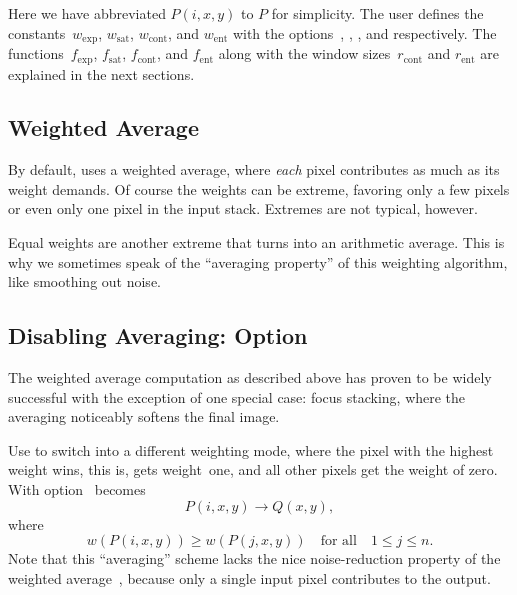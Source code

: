\noindent Here we have abbreviated $P(i, x, y)$ to $P$ for simplicity.  The user defines the
constants~$w_{\mathrm{exp}}$, $w_{\mathrm{sat}}$, $w_{\mathrm{cont}}$, and $w_{\mathrm{ent}}$
with the options~, ,
, and  respectively.  The
functions~$f_{\mathrm{exp}}$, $f_{\mathrm{sat}}$, $f_{\mathrm{cont}}$, and $f_{\mathrm{ent}}$
along with the window sizes~$r_{\mathrm{cont}}$ and $r_{\mathrm{ent}}$ are explained in the next
sections.


\subsection[Weighted Average]{\label{sec:weighted-average}%
  Weighted Average}

By default, \App{} uses a weighted average, where \emph{each} pixel contributes as much as its
weight demands.  Of course the weights can be extreme, favoring only a few pixels or even only
one pixel in the input stack.  Extremes are not typical, however.

Equal weights are another extreme that turns  into an arithmetic average.
This is why we sometimes speak of the ``averaging property'' of this weighting algorithm, like
smoothing out noise.


\subsection[Disabling Averaging]{\label{sec:disabling-averaging}%
  Disabling Averaging: Option~}

The weighted average computation as described above has proven to be widely successful with the
exception of one special case: focus stacking, where the averaging noticeably softens the final
image.

Use  to switch \App{} into a different weighting mode, where the pixel with
the highest weight wins, this is, gets weight~one, and all other pixels get the weight of zero.
With option~  becomes
\[                              %
    P(i, x, y) \rightarrow Q(x, y),
\]
where
\[
    w(P(i, x, y)) \geq w(P(j, x, y)) \quad \mbox{for all}\quad 1 \leq j \leq n.
\]
\noindent Note that this ``averaging'' scheme lacks the nice noise-reduction property of the
weighted average~, because only a single input pixel contributes to the
output.


